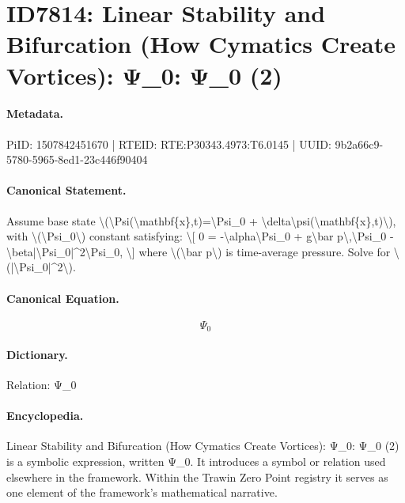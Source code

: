 \section*{ID7814: Linear Stability and Bifurcation (How Cymatics Create Vortices): Ψ\_0: Ψ\_0 (2)}
\paragraph{Metadata.}
PiID: 1507842451670 | RTEID: RTE:P30343.4973:T6.0145 | UUID: 9b2a66c9-5780-5965-8ed1-23c446f90404

\paragraph{Canonical Statement.}
Assume base state \textbackslash{}(\textbackslash{}Psi(\textbackslash{}mathbf\{x\},t)=\textbackslash{}Psi\_0 + \textbackslash{}delta\textbackslash{}psi(\textbackslash{}mathbf\{x\},t)\textbackslash{}), with \textbackslash{}(\textbackslash{}Psi\_0\textbackslash{}) constant satisfying: \textbackslash{}[ 0 = -\textbackslash{}alpha\textbackslash{}Psi\_0 + g\textbackslash{}bar p\textbackslash{},\textbackslash{}Psi\_0 - \textbackslash{}beta|\textbackslash{}Psi\_0|\textasciicircum{}2\textbackslash{}Psi\_0, \textbackslash{}] where \textbackslash{}(\textbackslash{}bar p\textbackslash{}) is time-average pressure. Solve for \textbackslash{}(|\textbackslash{}Psi\_0|\textasciicircum{}2\textbackslash{}).

\paragraph{Canonical Equation.}
\[
\Psi_0
\]

\paragraph{Dictionary.}
Relation: Ψ\_0

\paragraph{Encyclopedia.}
Linear Stability and Bifurcation (How Cymatics Create Vortices): Ψ\_0: Ψ\_0 (2) is a symbolic expression, written Ψ\_0. It introduces a symbol or relation used elsewhere in the framework. Within the Trawin Zero Point registry it serves as one element of the framework's mathematical narrative.
